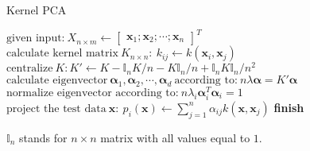 \begin{algorithm}
\caption{Kernel PCA}
\label{PCA}
\begin{algorithmic}[1]
	\State $\text{given input:} \  X_{n \times m} \leftarrow \begin{bmatrix} \mathbf{x}_1; \mathbf{x}_2; \cdots; \mathbf{x}_n \end{bmatrix}^T$
	\State $\text{calculate kernel matrix} \  K_{n \times n}: \  k_{ij} \leftarrow k(\mathbf{x}_i, \mathbf{x}_j)$
	\State $\text{centralize} \  K:  K' \leftarrow K - \mathbb{I}_nK/n - K\mathbb{I}_n/n + \mathbb{I}_nK\mathbb{I}_n/n^2$
	\State $\text{calculate eigenvector} \ \pmb{\alpha}_1, \pmb{\alpha}_2, \cdots, \pmb{\alpha}_d \   \text{according to:} \  n \lambda \pmb{\alpha} = K' \pmb{\alpha}$
	\State $\text{normalize eigenvector according to:} \  n \lambda_i \pmb{\alpha}_i^T \pmb{\alpha}_i = 1$
	\State $\text{project the test data} \  \mathbf{x}:  \  p_i(\mathbf{x}) \leftarrow \sum_{j=1}^n \alpha_{ij} k(\mathbf{x}, \mathbf{x}_j) $
\BState \bf finish
\EndProcedure
\end{algorithmic}
\end{algorithm}
 $\mathbb{I}_n$ stands for $n \times n$ matrix with all values equal to $1$.



\newpage


\clearpage

%
%
%



